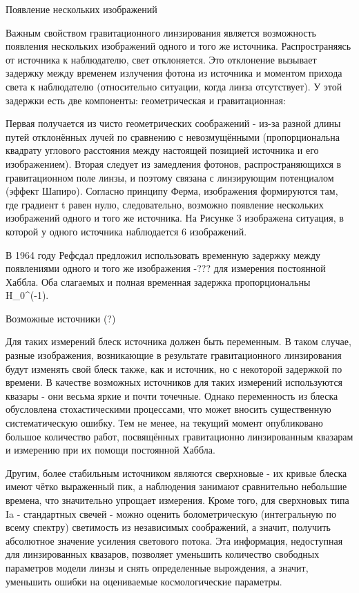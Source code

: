 Появление нескольких изображений

Важным свойством гравитационного линзирования является возможность появления нескольких изображений одного и того же источника. Распространяясь от источника к наблюдателю, свет отклоняется. Это отклонение вызывает задержку между временем излучения фотона из источника и моментом прихода света к наблюдателю (относительно ситуации, когда линза отсутствует). У этой задержки есть две компоненты: геометрическая и гравитационная:


Первая получается из чисто геометрических соображений - из-за разной длины путей отклонённых лучей по сравнению с невозмущёнными (пропорциональна квадрату углового расстояния между настоящей позицией источника и его изображением). Вторая следует из замедления фотонов, распространяющихся в гравитационном поле линзы, и поэтому связана с линзирующим потенциалом (эффект Шапиро). Согласно принципу Ферма, изображения формируются там, где градиент t равен нулю, следовательно, возможно появление нескольких изображений одного и того же источника. На Рисунке 3 изображена ситуация, в которой у одного источника наблюдается 6 изображений.

В 1964 году Рефсдал предложил использовать временную задержку между появлениями одного и того же изображения -??? для измерения постоянной Хаббла. Оба слагаемых и полная временная задержка пропорциональны H_0^(-1).

Возможные источники (?)

Для таких измерений блеск источника должен быть переменным. В таком случае, разные изображения, возникающие в результате гравитационного линзирования будут изменять свой блеск также, как и источник, но с некоторой задержкой по времени. В качестве возможных источников для таких измерений используются квазары - они весьма яркие и почти точечные. Однако переменность из блеска обусловлена стохастическими процессами, что может вносить существенную систематическую ошибку. Тем не менее, на текущий момент опубликовано большое количество работ, посвящённых гравитационно линзированным квазарам и измерению при их помощи постоянной Хаббла.

Другим, более стабильным источником являются сверхновые - их кривые блеска имеют чётко выраженный пик, а наблюдения занимают сравнительно небольшие времена, что значительно упрощает измерения. Кроме того, для сверхновых типа Ia - стандартных свечей - можно оценить болометрическую (интегральную по всему спектру) светимость из независимых соображений, а значит, получить абсолютное значение усиления светового потока. Эта информация, недоступная для линзированных квазаров, позволяет уменьшить количество свободных параметров модели линзы и снять определенные вырождения, а значит, уменьшить ошибки на  оцениваемые космологические параметры.  

